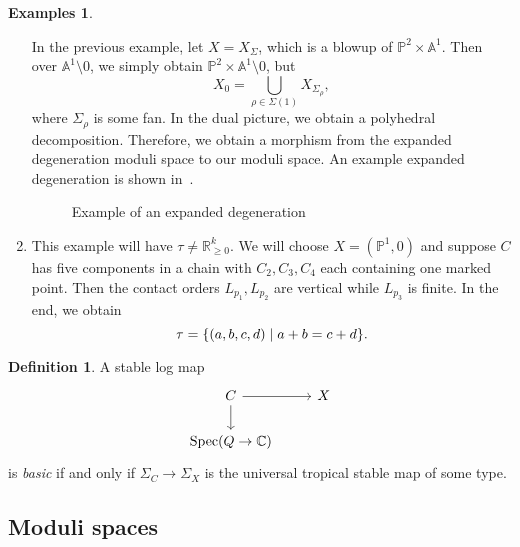 \documentclass[leqno, openany]{memoir}
\theoremstyle{definition}
\newtheorem{defn}[thm]{Definition}
\newtheorem{exms}[thm]{Examples}
\theoremstyle{remark}
\theoremstyle{plain}
\theoremstyle{definition}
\theoremstyle{remark}
\newcommand{\A}{\mathbb{A}}
\newcommand{\R}{\mathbb{R}}
\newcommand{\C}{\mathbb{C}}
\renewcommand{\P}{\mathbb{P}}
\DeclareMathOperator{\Spec}{Spec}
\begin{document}
\begin{exms}
\begin{enumerate}
In the previous example, let $X = X_{\Sigma}$, which is a blowup of $\P^2 \times \A^1$. Then over $\A^1 \setminus \qty{0}$, we simply obtain $\P^2 \times \A^1 \setminus \qty{0}$, but
\[ X_0 = \bigcup_{\rho \in \Sigma(1)} X_{\Sigma_{\rho}}, \]
where $\Sigma_{\rho}$ is some fan. In the dual picture, we obtain a polyhedral decomposition. Therefore, we obtain a morphism from the expanded degeneration moduli space to our moduli space. An example expanded degeneration is shown in~.
\begin{figure}[htpb]
  \centering
  \caption{Example of an expanded degeneration}
  \label{fig:expanded}
\end{figure}

\item This example will have $\tau \neq \R_{\geq 0}^k$. We will choose $X = (\P^1, 0)$ and suppose $C$ has five components in a chain with $C_2, C_3, C_4$ each containing one marked point. Then the contact orders $L_{p_1}, L_{p_2}$ are vertical while $L_{p_3}$ is finite. In the end, we obtain
\[ \tau = \qty{(a,b,c,d) \mid a+b=c+d}. \]
\end{enumerate}
\end{exms}


\begin{defn}
  A stable log map
  \begin{equation*}
    \begin{tikzcd}
      C \ar{d} \ar{r} & X \\
      \Spec (Q \to \C)
    \end{tikzcd}
  \end{equation*}
  is \textit{basic} if and only if $\Sigma_C \to \Sigma_X$ is the universal tropical stable map of some type.
\end{defn}

\subsection{Moduli spaces}
\label{subsec:moduli}
\end{document}
